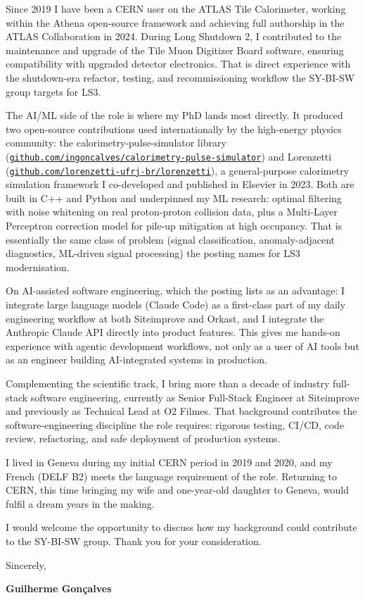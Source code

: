 \documentclass[11pt,a4paper]{article}
\begin{document}
Since 2019 I have been a CERN user on the ATLAS Tile Calorimeter, working within the Athena open-source framework and achieving full authorship in the ATLAS Collaboration in 2024. During Long Shutdown 2, I contributed to the maintenance and upgrade of the Tile Muon Digitizer Board software, ensuring compatibility with upgraded detector electronics. That is direct experience with the shutdown-era refactor, testing, and recommissioning workflow the SY-BI-SW group targets for LS3.

The AI/ML side of the role is where my PhD lands most directly. It produced two open-source contributions used internationally by the high-energy physics community: the calorimetry-pulse-simulator library (\href{https://github.com/ingoncalves/calorimetry-pulse-simulator}{\nolinkurl{github.com/ingoncalves/calorimetry-pulse-simulator}}) and Lorenzetti (\href{https://github.com/lorenzetti-ufrj-br/lorenzetti}{\nolinkurl{github.com/lorenzetti-ufrj-br/lorenzetti}}), a general-purpose calorimetry simulation framework I co-developed and published in Elsevier in 2023. Both are built in C++ and Python and underpinned my ML research: optimal filtering with noise whitening on real proton-proton collision data, plus a Multi-Layer Perceptron correction model for pile-up mitigation at high occupancy. That is essentially the same class of problem (signal classification, anomaly-adjacent diagnostics, ML-driven signal processing) the posting names for LS3 modernisation.

On AI-assisted software engineering, which the posting lists as an advantage: I integrate large language models (Claude Code) as a first-class part of my daily engineering workflow at both Siteimprove and Orkast, and I integrate the Anthropic Claude API directly into product features. This gives me hands-on experience with agentic development workflows, not only as a user of AI tools but as an engineer building AI-integrated systems in production.

Complementing the scientific track, I bring more than a decade of industry full-stack software engineering, currently as Senior Full-Stack Engineer at Siteimprove and previously as Technical Lead at O2 Filmes. That background contributes the software-engineering discipline the role requires: rigorous testing, CI/CD, code review, refactoring, and safe deployment of production systems.

I lived in Geneva during my initial CERN period in 2019 and 2020, and my French (DELF B2) meets the language requirement of the role. Returning to CERN, this time bringing my wife and one-year-old daughter to Geneva, would fulfil a dream years in the making.

I would welcome the opportunity to discuss how my background could contribute to the SY-BI-SW group. Thank you for your consideration.

\vspace{1em}

\closing{Sincerely,}

\vspace{2em}

\textbf{Guilherme Gonçalves}
\end{document}
